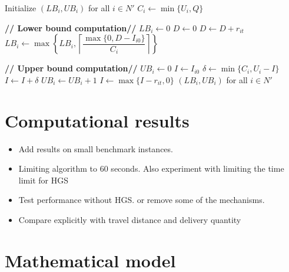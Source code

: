 \documentclass{article}
\begin{document}
\begin{algorithm}[H]
\caption{\textbf{Compute customer-wise visit bounds}}
\label{alg:visit_bounds}
\begin{algorithmic}[1]
\STATE Initialize $(LB_i,UB_i)$ for all $i\in N'$
    \STATE $C_i \gets \min\{U_i,Q\}$
    
    \STATE \textbf{// Lower bound computation//}
    \STATE $LB_i \gets 0$
    \STATE $D \gets 0$
        \STATE $D \gets D + r_{it}$
        \STATE $LB_i \gets \max\left\{LB_i,\left\lceil \dfrac{\max\{0,D-I_{i0}\}}{C_i}\right\rceil\right\}$
    \ENDFOR
    
    \STATE \textbf{// Upper bound computation//}
    \STATE $UB_i \gets 0$
    \STATE $I \gets I_{i0}$
            \STATE $\delta \gets \min\{C_i,U_i-I\}$
                \STATE $I \gets I + \delta$
                \STATE $UB_i \gets UB_i + 1$
            \ENDIF
        \ENDIF
        \STATE $I \gets \max\{I - r_{it},0\}$
    \ENDFOR
\ENDFOR
\RETURN $(LB_i,UB_i)$  for all $i\in N'$
\end{algorithmic}
\end{algorithm}

\section{Computational results}

\begin{itemize}
    \item Add results on small benchmark instances.
    \item Limiting algorithm to 60 seconds. Also experiment with limiting the time limit for HGS
    \item Test performance without HGS. or remove some of the mechanisms.

    \item Compare explicitly with travel distance and delivery quantity

\end{itemize}





\appendix

\section{Mathematical model}\label{math model}
\end{document}
